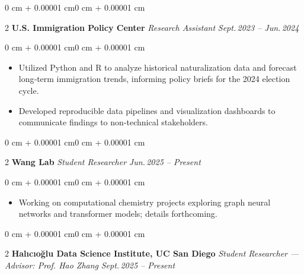 \documentclass[10pt, letterpaper]{article}
\newenvironment{highlights}{\begin{itemize}[topsep=0.10 cm, parsep=0.10 cm, partopsep=0pt, itemsep=0pt, leftmargin=0 cm + 10pt]}{\end{itemize}}
\newenvironment{onecolentry}{\begin{adjustwidth}{0 cm + 0.00001 cm}{0 cm + 0.00001 cm}}{\end{adjustwidth}}
\newenvironment{twocolentry}[2][]{\onecolentry \def\secondColumn{#2} \setcolumnwidth{\fill, 4.5 cm} \begin{paracol}{2}}{\switchcolumn \raggedleft \secondColumn \end{paracol} \endonecolentry}
\begin{document}
    \vspace{0.20 cm}

    \begin{twocolentry}{\textit{Sept.\,2023 -- Jun.\,2024}}
        \textbf{U.S. Immigration Policy Center}\newline
        \textit{Research Assistant}
    \end{twocolentry}

    \vspace{0.10 cm}
    \begin{onecolentry}
        \begin{highlights}
            \item Utilized Python and R to analyze historical naturalization data and forecast long‑term immigration trends, informing policy briefs for the 2024 election cycle.
            \item Developed reproducible data pipelines and visualization dashboards to communicate findings to non‑technical stakeholders.
        \end{highlights}
    \end{onecolentry}

    \vspace{0.20 cm}

    \begin{twocolentry}{\textit{Jun.\,2025 -- Present}}
        \textbf{Wang Lab}\newline
        \textit{Student Researcher}
    \end{twocolentry}

    \vspace{0.10 cm}
    \begin{onecolentry}
        \begin{highlights}
            \item Working on computational chemistry projects exploring graph neural networks and transformer models; details forthcoming.
        \end{highlights}
    \end{onecolentry}

    \vspace{0.20 cm}

    \begin{twocolentry}{\textit{Sept.\,2025 -- Present}}
        \textbf{Halıcıo\u{g}lu Data Science Institute, UC San Diego}\newline
        \textit{Student Researcher — Advisor: Prof. Hao Zhang}
    \end{twocolentry}
\end{document}
